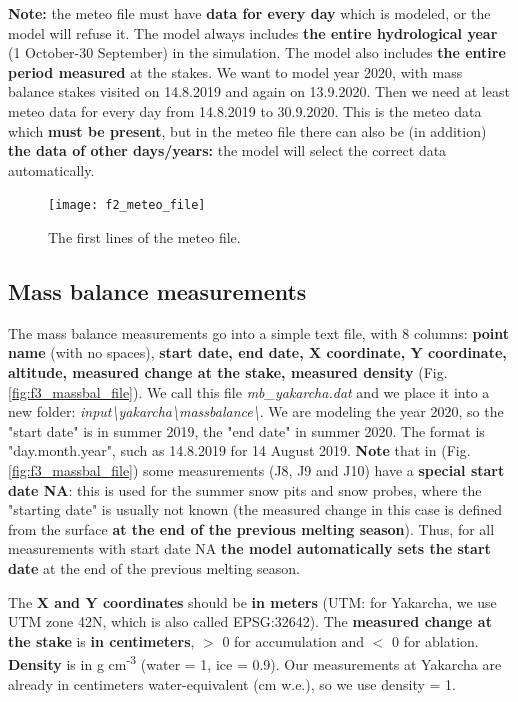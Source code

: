 \documentclass[15pt]{extarticle}
\begin{document}
\textbf{Note:} the meteo file must have \textbf{data for every day} which is modeled, or the model will refuse it. The model always includes \textbf{the entire hydrological year} (1 October-30 September) in the simulation. The model also includes \textbf{the entire period measured} at the stakes. We want to model year 2020, with mass balance stakes visited on 14.8.2019 and again on 13.9.2020. Then we need at least meteo data for every day from 14.8.2019 to 30.9.2020. This is the meteo data which \textbf{must be present}, but in the meteo file there can also be (in addition) \textbf{the data of other days/years:} the model will select the correct data automatically.

\begin{figure}[h]
    \centering
    \texttt{[image: f2\_meteo\_file]}
    \caption{The first lines of the meteo file.}
    \label{fig:f2_meteo_file}
\end{figure}


\subsection{Mass balance measurements}
\label{sect:input_mb}
The mass balance measurements go into a simple text file, with 8 columns: \textbf{point name} (with no spaces), \textbf{start date, end date, X coordinate, Y coordinate, altitude, measured change at the stake, measured density} (Fig. \ref{fig:f3_massbal_file}). We call this file \textit{mb\_yakarcha.dat} and we place it into a new folder: \textit{input\textbackslash yakarcha\textbackslash massbalance\textbackslash}. We are modeling the year 2020, so the "start date" is in summer 2019, the "end date" in summer 2020. The format is "day.month.year", such as 14.8.2019 for 14 August 2019. \textbf{Note} that in (Fig. \ref{fig:f3_massbal_file}) some measurements (J8, J9 and J10) have a \textbf{special start date NA}: this is used for the summer snow pits and snow probes, where the "starting date" is usually not known (the measured change in this case is defined from the surface \textbf{at the end of the previous melting season}). Thus, for all measurements with start date NA \textbf{the model automatically sets the start date} at the end of the previous melting season.

The \textbf{X and Y coordinates} should be \textbf{in meters} (UTM: for Yakarcha, we use UTM zone 42N, which is also called EPSG:32642). The \textbf{measured change at the stake} is \textbf{in centimeters}, $>$ 0 for accumulation and $<$ 0 for ablation. \textbf{Density} is in g cm\textsuperscript{-3} (water = 1, ice = 0.9). Our measurements at Yakarcha are already in centimeters water-equivalent (cm w.e.), so we use density = 1.
\end{document}

